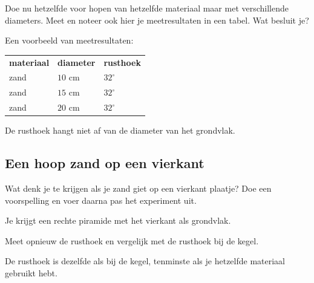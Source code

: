 \documentclass{ximera}
\begin{document}
\begin{exercise}
    Doe nu hetzelfde voor hopen van hetzelfde materiaal maar met verschillende diameters.
    Meet en noteer ook hier je meetresultaten in een tabel. Wat besluit je?
    \begin{oplossing}
        Een voorbeeld van meetresultaten:
        \begin{center}
        \begin{tabular}{l l l}
            \textbf{materiaal} & \textbf{diameter} & \textbf{rusthoek} \\
            zand & \(10\) cm & \(32^\circ\) \\
            zand & \(15\) cm & \(32^\circ\) \\
            zand & \(20\) cm & \(32^\circ\) \\
        \end{tabular}
        \end{center}
        De rusthoek hangt niet af van de diameter van het grondvlak.
    \end{oplossing}
\end{exercise}


\subsection*{Een hoop zand op een vierkant}

\begin{exercise}
    Wat denk je te krijgen als je zand giet op een vierkant plaatje? Doe een voorspelling
    en voer daarna pas het experiment uit.
    \begin{oplossing}
        Je krijgt een rechte piramide met het vierkant als grondvlak.
    \end{oplossing}
\end{exercise}


\begin{exercise}
    Meet opnieuw de rusthoek en vergelijk met de rusthoek bij de kegel.
    \begin{oplossing}
        De rusthoek is dezelfde als bij de kegel, tenminste als je hetzelfde materiaal
        gebruikt hebt.
    \end{oplossing}
\end{exercise}
\end{document}
